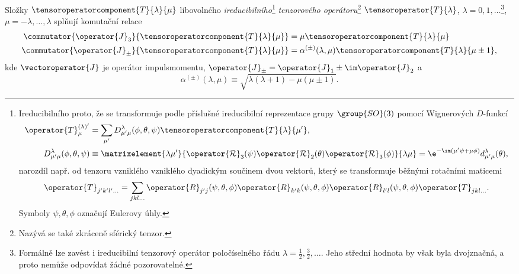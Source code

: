 	Složky $\tensoroperatorcomponent{T}{\lambda}{\mu}$ libovolného \emph{ireducibilního}\footnote{
		Ireducibilního proto, že se transformuje podle příslušné 
		ireducibilní reprezentace grupy $\group{SO}(3)$ pomocí Wignerových $D$-funkcí
		\begin{subequations}
			\begin{align}
				\operator{T}_{\mu}^{(\lambda)'}
					&=\sum_{\mu'}D_{\mu'\mu}^{\lambda}(\phi,\theta,\psi)\tensoroperatorcomponent{T}{\lambda}{\mu'},\\
				D_{\mu'\mu}^{\lambda}(\phi,\theta,\psi)
					&\equiv\matrixelement{\lambda\mu'}{\operator{\mathcal{R}}_{3}(\psi)\operator{\mathcal{R}}_{2}(\theta)
						\operator{\mathcal{R}}_{3}(\phi)}{\lambda\mu}
					=\e^{-\im(\mu'\psi+\mu\phi)}d^{\lambda}_{\mu'\mu}(\theta),
			\end{align}				
		\end{subequations}
		narozdíl např. od tenzoru vzniklého vzniklého dyadickým součinem dvou vektorů, 
		který se transformuje běžnými rotačními maticemi
		\begin{equation}
			\operator{T}_{j'k'l'\dotsc}=\sum_{jkl\dotsc}\operator{R}_{j'j}(\psi,\theta,\phi)
				\operator{R}_{k'k}(\psi,\theta,\phi)\operator{R}_{l'l}(\psi,\theta,\phi)\operator{T}_{jkl\dotsc}.
		\end{equation}
		Symboly $\psi,\theta,\phi$ označují Eulerovy úhly.
	} 
	\emph{tenzorového operátoru}\footnote{
		Nazývá se také zkráceně sférický tenzor.
	}
	$\tensoroperator{T}{\lambda}$, $\lambda=0,1,\dotsc$\footnote{
		Formálně lze zavést i ireducibilní tenzorový operátor poločíselného řádu 
		$\lambda=\frac{1}{2},\frac{3}{2},\dotsc$.
		Jeho střední hodnota by však byla dvojznačná, a proto nemůže odpovídat žádné pozorovatelné.
	}, $\mu=-\lambda,\dotsc,\lambda$
	splňují komutační relace
	\begin{subequations}
		\begin{align}
			\commutator{\operator{J}_{3}}{\tensoroperatorcomponent{T}{\lambda}{\mu}}
				&=\mu\tensoroperatorcomponent{T}{\lambda}{\mu}\\
			\commutator{\operator{J}_{\pm}}{\tensoroperatorcomponent{T}{\lambda}{\mu}}
				&=\alpha^{(\pm)}(\lambda,\mu)\tensoroperatorcomponent{T}{\lambda}{\mu\pm1},
		\end{align}			
		\label{eq:IrreducibleTensor}
	\end{subequations}
	kde $\vectoroperator{J}$ je operátor impulsmomentu, $\operator{J}_{\pm}=\operator{J}_{1}\pm\im\operator{J}_{2}$ a
	\begin{equation}
		\alpha^{(\pm)}(\lambda,\mu)
			\equiv\sqrt{\lambda(\lambda+1)-\mu(\mu\pm1)}.
	\end{equation}
